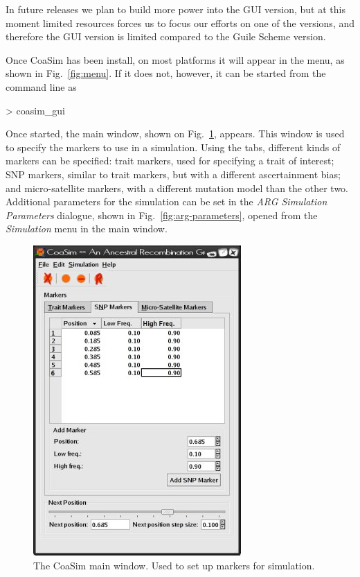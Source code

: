 \documentclass{manual}
\begin{document}
In future releases we plan to build more power into the GUI version,
but at this moment limited resources forces us to focus our efforts on
one of the versions, and therefore the GUI version is limited compared
to the Guile Scheme version.

Once CoaSim has been install, on most platforms it will appear in the
menu, as shown in Fig.~\ref{fig:menu}.  If it does not, however, it
can be started from the command line as
\begin{code}
> coasim_gui
\end{code}

Once started, the main window, shown on Fig.~\ref{fig:main}, appears.
This window is used to specify the markers to use in a simulation.
Using the tabs, different kinds of markers can be specified: trait
markers, used for specifying a trait of interest; SNP markers, similar
to trait markers, but with a different ascertainment bias; and
micro-satellite markers, with a different mutation model than the
other two.  Additional parameters for the simulation can be set in the
\emph{ARG Simulation Parameters} dialogue, shown in
Fig.~\ref{fig:arg-parameters}, opened from the \emph{Simulation} menu
in the main window.

\begin{figure}[tp]
  \centering
  \includegraphics{figs/main-window}
  \caption{The CoaSim main window.  Used to set up markers for simulation.}
  \label{fig:main}
\end{figure}
\end{document}
